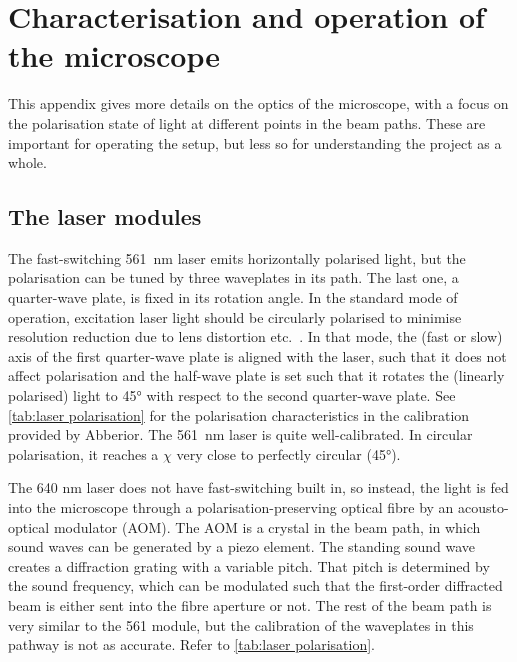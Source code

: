 \chapter{Characterisation and operation of the microscope}
\label{chap:characterisation}

This appendix gives more details on the optics of the microscope, with a focus on the polarisation state of light at different points in the beam paths. These are important for operating the setup, but less so for understanding the project as a whole.

\section{The laser modules}

The fast-switching 561~nm laser emits horizontally polarised light, but the polarisation can be tuned by three waveplates in its path. The last one, a quarter-wave plate, is fixed in its rotation angle. In the standard mode of operation, excitation laser light should be circularly polarised to minimise resolution reduction due to lens distortion etc.~\cite{Harke2008}. In that mode, the (fast or slow) axis of the first quarter-wave plate is aligned with the laser, such that it does not affect polarisation and the half-wave plate is set such that it rotates the (linearly polarised) light to \ang{45} with respect to the second quarter-wave plate. See \autoref{tab:laser polarisation} for the polarisation characteristics in the calibration provided by Abberior. The 561~nm laser is quite well-calibrated. In circular polarisation, it reaches a $ \chi$ very close to perfectly circular (\ang{45}).

The 640 nm laser does not have fast-switching built in, so instead, the light is fed into the microscope through a polarisation-preserving optical fibre by an acousto-optical modulator (AOM). The AOM is a crystal in the beam path, in which sound waves can be generated by a piezo element. The standing sound wave creates a diffraction grating with a variable pitch. That pitch is determined by the sound frequency, which can be modulated such that the first-order diffracted beam is either sent into the fibre aperture or not. The rest of the beam path is very similar to the 561 module, but the calibration of the waveplates in this pathway is not as accurate. Refer to \autoref{tab:laser polarisation}. 

